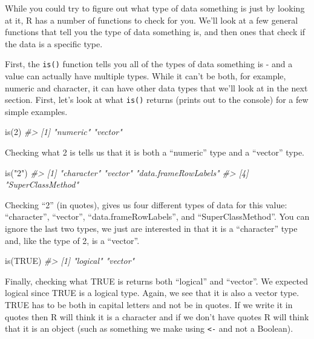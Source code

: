\documentclass[
]{krantz}
\makeatletter
\newenvironment{Shaded}{\begin{snugshade}}{\end{snugshade}}
\newcommand{\CommentTok}[1]{\textcolor[rgb]{0.37,0.37,0.37}{\textit{#1}}}
\newcommand{\ConstantTok}[1]{\textcolor[rgb]{0,0,0}{#1}}
\newcommand{\DecValTok}[1]{\textcolor[rgb]{0.06,0.06,0.06}{#1}}
\newcommand{\FunctionTok}[1]{\textcolor[rgb]{0,0,0}{#1}}
\newcommand{\NormalTok}[1]{#1}
\newcommand{\StringTok}[1]{\textcolor[rgb]{0.5,0.5,0.5}{#1}}
\newenvironment{kframe}{%
\medskip{}
\setlength{\fboxsep}{.8em}
 \def\at@end@of@kframe{}%
 \ifinner\ifhmode%
  \def\at@end@of@kframe{\end{minipage}}%
  \begin{minipage}{\columnwidth}%
 \fi\fi%
 \def\FrameCommand##1{\hskip\@totalleftmargin \hskip-\fboxsep
 \colorbox{shadecolor}{##1}\hskip-\fboxsep
     \hskip-\linewidth \hskip-\@totalleftmargin \hskip\columnwidth}%
 \MakeFramed {\advance\hsize-\width
   \@totalleftmargin\z@ \linewidth\hsize
   \@setminipage}}%
 {\par\unskip\endMakeFramed%
 \at@end@of@kframe}
\renewenvironment{Shaded}{\begin{kframe}}{\end{kframe}}
\makeatother
\begin{document}
While you could try to figure out what type of data something is just by looking at it, R has a number of functions to check for you. We'll look at a few general functions that tell you the type of data something is, and then ones that check if the data is a specific type.

First, the \texttt{is()} function tells you all of the types of data something is - and a value can actually have multiple types. While it can't be both, for example, numeric and character, it can have other data types that we'll look at in the next section. First, let's look at what \texttt{is()} returns (prints out to the console) for a few simple examples.

\begin{Shaded}
\begin{Highlighting}[]
\FunctionTok{is}\NormalTok{(}\DecValTok{2}\NormalTok{)}
\CommentTok{\#\textgreater{} [1] "numeric" "vector"}
\end{Highlighting}
\end{Shaded}

Checking what 2 is tells us that it is both a ``numeric'' type and a ``vector'' type.

\begin{Shaded}
\begin{Highlighting}[]
\FunctionTok{is}\NormalTok{(}\StringTok{"2"}\NormalTok{)}
\CommentTok{\#\textgreater{} [1] "character"           "vector"              "data.frameRowLabels"}
\CommentTok{\#\textgreater{} [4] "SuperClassMethod"}
\end{Highlighting}
\end{Shaded}

Checking ``2'' (in quotes), gives us four different types of data for this value: ``character'', ``vector'', ``data.frameRowLabels'', and ``SuperClassMethod''. You can ignore the last two types, we just are interested in that it is a ``character'' type and, like the type of 2, is a ``vector''.

\begin{Shaded}
\begin{Highlighting}[]
\FunctionTok{is}\NormalTok{(}\ConstantTok{TRUE}\NormalTok{)}
\CommentTok{\#\textgreater{} [1] "logical" "vector"}
\end{Highlighting}
\end{Shaded}

Finally, checking what TRUE is returns both ``logical'' and ``vector''. We expected logical since TRUE is a logical type. Again, we see that it is also a vector type. TRUE has to be both in capital letters and not be in quotes. If we write it in quotes then R will think it is a character and if we don't have quotes R will think that it is an object (such as something we make using \texttt{\textless{}-} and not a Boolean).
\end{document}
